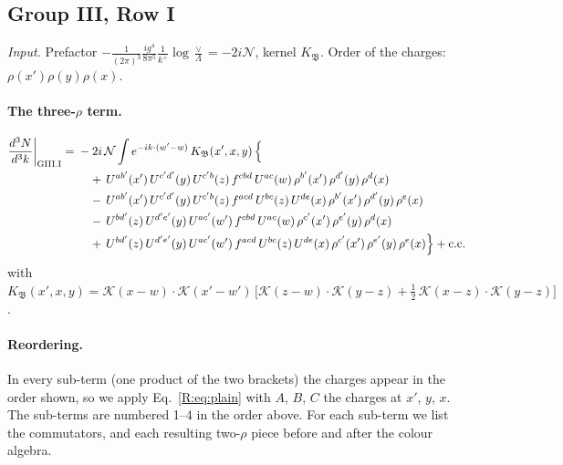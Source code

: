 \documentclass[10pt]{article}
\numberwithin{equation}{section}
\newcommand{\KK}{\mathcal K}
\newcommand{\NN}{\mathcal N}
\begin{document}
\subsection{Group III, Row I}\label{R:sec:GIII.I}
\emph{Input.} Prefactor $-\frac{1}{(2\pi)^3}\frac{ig^4}{8\pi^5}\frac1{k^+}\log\frac\vee\Lambda=-2i\NN$, kernel $K_{\mathfrak B}$. Order of the charges: $\rho(x')\rho(y)\rho(x)$.
\paragraph{The three-$\rho$ term.}
\begin{align}
\frac{d^3N}{d^3k}\bigg|_{\rm GIII.I}={}&-2i\,\NN\int e^{-ik\cdot(w'-w)}\,K_{\mathfrak B}(x',x,y)\,\Big\{\notag\\
&\quad +\,U^{ab'}(x')\,U^{c'd'}(y)\,U^{c'b}(z)\,f^{cbd}\,U^{ac}(w)\,\rho^{b'}(x')\,\rho^{d'}(y)\,\rho^{d}(x)\notag\\
&\quad -\,U^{ab'}(x')\,U^{c'd'}(y)\,U^{c'b}(z)\,f^{acd}\,U^{bc}(z)\,U^{de}(x)\,\rho^{b'}(x')\,\rho^{d'}(y)\,\rho^{e}(x)\notag\\
&\quad -\,U^{bd'}(z)\,U^{d'e'}(y)\,U^{ac'}(w')\,f^{cbd}\,U^{ac}(w)\,\rho^{c'}(x')\,\rho^{e'}(y)\,\rho^{d}(x)\notag\\
&\quad +\,U^{bd'}(z)\,U^{d'e'}(y)\,U^{ac'}(w')\,f^{acd}\,U^{bc}(z)\,U^{de}(x)\,\rho^{c'}(x')\,\rho^{e'}(y)\,\rho^{e}(x)\Big\}+{\rm c.c.}\label{R:eq:in-GIII.I}
\end{align}
with $K_{\mathfrak B}(x',x,y)=\KK(x-w)\cdot\KK(x'-w')\,\Big[\KK(z-w)\cdot\KK(y-z)+\tfrac12\,\KK(x-z)\cdot\KK(y-z)\Big]$.
\paragraph{Reordering.} In every sub-term (one product of the two brackets) the charges appear in the order shown, so we apply Eq.~\eqref{R:eq:plain} with $A$, $B$, $C$ the charges at $x'$, $y$, $x$. The sub-terms are numbered 1--4 in the order above. For each sub-term we list the commutators, and each resulting two-$\rho$ piece before and after the colour algebra.
\end{document}
